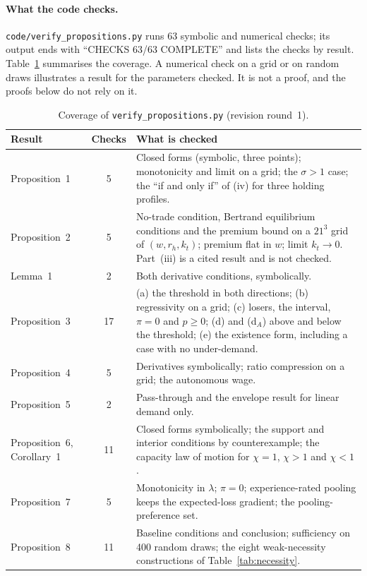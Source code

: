 \documentclass[12pt]{article}
\theoremstyle{remark}
\begin{document}
\paragraph{What the code checks.} \texttt{code/verify\_propositions.py} runs 63 symbolic and numerical checks; its output ends with ``CHECKS 63/63 COMPLETE'' and lists the checks by result. Table~\ref{tab:coverage} summarises the coverage. A numerical check on a grid or on random draws illustrates a result for the parameters checked. It is not a proof, and the proofs below do not rely on it.

\begin{table}[h]\centering\small
\caption{Coverage of \texttt{verify\_propositions.py} (revision round~1).}\label{tab:coverage}
\begin{tabular}{p{}cp{}}
\toprule
Result & Checks & What is checked\\
\midrule
Proposition~1 & 5 & Closed forms (symbolic, three points); monotonicity and limit on a grid; the $\sigma>1$ case; the ``if and only if'' of (iv) for three holding profiles.\\
Proposition~2 & 5 & No-trade condition, Bertrand equilibrium conditions and the premium bound on a $21^3$ grid of $(w,r_h,k_t)$; premium flat in $w$; limit $k_t\to0$. Part~(iii) is a cited result and is not checked.\\
Lemma~1 & 2 & Both derivative conditions, symbolically.\\
Proposition~3 & 17 & (a) the threshold in both directions; (b) regressivity on a grid; (c) losers, the interval, $\pi=0$ and $p\ge0$; (d) and (d$_A$) above and below the threshold; (e) the existence form, including a case with no under-demand.\\
Proposition~4 & 5 & Derivatives symbolically; ratio compression on a grid; the autonomous wage.\\
Proposition~5 & 2 & Pass-through and the envelope result for linear demand only.\\
Proposition~6, Corollary~1 & 11 & Closed forms symbolically; the support and interior conditions by counterexample; the capacity law of motion for $\chi=1$, $\chi>1$ and $\chi<1$.\\
Proposition~7 & 5 & Monotonicity in $\lambda$; $\pi=0$; experience-rated pooling keeps the expected-loss gradient; the pooling-preference set.\\
Proposition~8 & 11 & Baseline conditions and conclusion; sufficiency on 400 random draws; the eight weak-necessity constructions of Table~\ref{tab:necessity}.\\
\bottomrule
\end{tabular}
\end{table}
\end{document}

